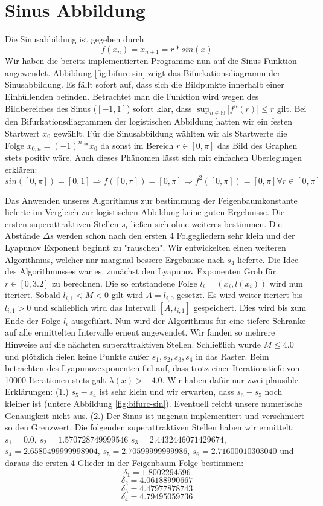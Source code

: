 \documentclass{scrartcl}
\begin{document}
\section{Sinus Abbildung}
Die Sinusabbildung ist gegeben durch 
$$f(x_n)=x_{n+1}=r*sin(x)$$
Wir haben die bereits implementierten Programme nun auf die Sinus Funktion angewendet. Abbildung \ref{fig:bifurc-sin} zeigt das Bifurkationsdiagramm der Sinusabbildung. Es fällt sofort auf, dass sich die Bildpunkte innerhalb einer Einhüllenden befinden. Betrachtet man die Funktion wird wegen des Bildbereiches des Sinus ($[-1,1]$) sofort klar, dass $\sup_{n \in \mathbb{N}} |f^n(r)| \leq r $ gilt. Bei den Bifurkationsdiagrammen der logistischen Abbildung hatten wir ein festen Startwert $x_0$ gewählt. Für die Sinusabbildung wählten wir als Startwerte die Folge $x_{0,n} = (-1)^n * x_0$ da sonst im Bereich $r \in [0,\pi]$ das Bild des Graphen stets positiv wäre. Auch dieses Phänomen lässt sich mit einfachen Überlegungen erklären: 
$$sin([0,\pi]) = [0,1] \Rightarrow f([0,\pi]) = [0,\pi] \Rightarrow f^2([0,\pi]) = [0,\pi] \forall r \in [0,\pi]$$
 
Das Anwenden unseres Algorithmus zur bestimmung der Feigenbaumkonstante lieferte im Vergleich zur logistischen Abbildung keine guten Ergebnisse. Die ersten superattraktiven Stellen $s_i$ ließen sich ohne weiteres bestimmen. Die Abstände $\Delta s$ werden schon nach den ersten 4 Folgegliedern sehr klein und der Lyapunov Exponent beginnt zu "rauschen". 
Wir entwickelten einen weiteren Algorithmus, welcher nur marginal bessere Ergebnisse nach $s_4$ lieferte. Die Idee des Algorithmusses war es, zunächst den Lyapunov Exponenten Grob für $r\in [0,3.2]$ zu berechnen. 
Die so entstandene Folge $l_i=(x_i, l(x_i))$ wird nun iteriert. Sobald $l_{i,1} < M < 0$ gilt wird $A=l_{i,0}$ gesetzt. Es wird weiter iteriert bis $l_{i,1} > 0$ und schließlich wird das Intervall $[A, l_{i,1}]$ gespeichert. Dies wird bis zum Ende der Folge $l_i$ ausgeführt. 
Nun wird der Algorithmus für eine tiefere Schranke auf alle ermittelten Intervalle erneut angewendet. 
Wir fanden so mehrere Hinweise auf die nächsten superattraktiven Stellen. 
Schließlich wurde $M \leq 4.0$ und plötzlich fielen keine Punkte außer $s_1, s_2, s_3, s_4$ in das Raster. Beim betrachten des Lyapunovexponenten fiel auf, dass trotz einer Iterationstiefe von 10000 Iterationen stets galt $\lambda(x)>-4.0$. 
Wir haben dafür nur zwei plausible Erklärungen: 
(1.) $s_5-s_4$ ist sehr klein und wir erwarten, dass $s_6-s_5$ noch kleiner ist (untere Abbildung \ref{fig:bifurc-sin}). Eventuell reicht unsere numerische Genauigkeit nicht aus. 
(2.) Der Sinus ist ungenau implementiert und verschmiert so den Grenzwert. 
Die folgenden superattraktiven Stellen haben wir ermittelt: $s_1=0.0$, $s_2=1.570728749999546$ $s_3=2.4432446071429674$, $s_4=2.6580499999998904$, $s_5=2.70599999999986$, $s_6=2.71600010303040$ und daraus die ersten 4 Glieder in der Feigenbaum Folge bestimmen:
$$\delta_1=1.8002294596$$
$$\delta_2=4.06188990667$$
$$\delta_3=4.47977878743$$
$$\delta_4=4.79495059736$$
\end{document}
